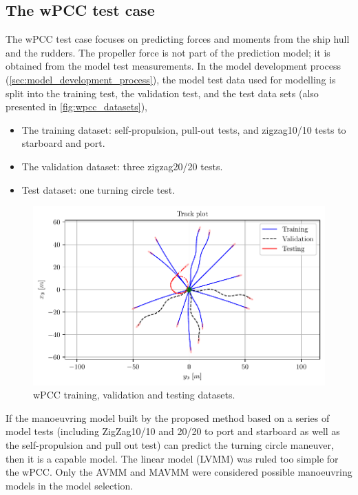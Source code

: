 \subsection{The wPCC test case}
\label{\detokenize{05.01_case_studies:the-wpcc-test-scenarios}}
The wPCC test case focuses on predicting forces and moments from the ship hull and the rudders. The propeller force is not part of the prediction model; it is obtained from the model test measurements.
In the model development process (\autoref{sec:model_development_process}), the model test data used for modelling is split into the training test, the validation test, and the test data sets (also presented in \autoref{fig:wpcc_datasets}), 
\vspace{5pt}
\begin{itemize}
    \setlength\itemsep{5pt}
    \item The training dataset: self-propulsion, pull-out tests, and zigzag10/10 tests to starboard and port.
    \item The validation dataset: three zigzag20/20 tests.
    \item Test dataset: one turning circle test.
\end{itemize}
\begin{figure}[h!]
\centering
\includegraphics[width= 1.0\linewidth]{kappa/images/3.pdf}
\caption{wPCC training, validation and testing datasets.}
\label{fig:wpcc_datasets}
\end{figure}
\noindent If the manoeuvring model built by the proposed method based on a series of model tests (including ZigZag10/10 and 20/20 to port and starboard as well as the self-propulsion and pull out test) \cite{imo_standards_2002} can predict the turning circle maneuver, then it is a capable model. The linear model (LVMM) was ruled too simple for the wPCC. Only the AVMM and MAVMM were considered possible manoeuvring models in the model selection.
